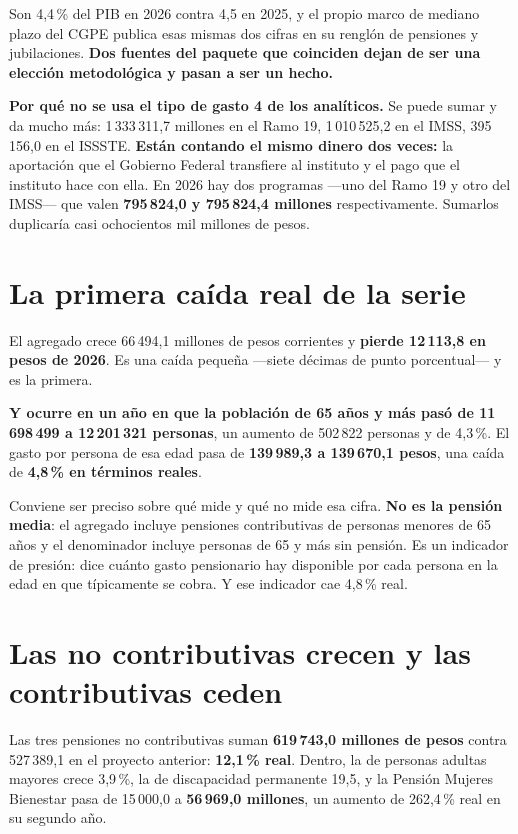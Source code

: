 Son 4,4\,\% del PIB en 2026 contra 4,5 en 2025, y el propio marco de mediano plazo del CGPE
publica esas mismas dos cifras en su renglón de pensiones y jubilaciones. \textbf{Dos fuentes
del paquete que coinciden dejan de ser una elección metodológica y pasan a ser un hecho.}

\textbf{Por qué no se usa el tipo de gasto 4 de los analíticos.} Se puede sumar y da mucho
más: 1\,333\,311,7 millones en el Ramo 19, 1\,010\,525,2 en el IMSS, 395\,156,0 en el ISSSTE.
\textbf{Están contando el mismo dinero dos veces:} la aportación que el Gobierno Federal
transfiere al instituto y el pago que el instituto hace con ella. En 2026 hay dos programas
---uno del Ramo 19 y otro del IMSS--- que valen \textbf{795\,824,0 y 795\,824,4 millones}
respectivamente. Sumarlos duplicaría casi ochocientos mil millones de pesos.

\section{La primera caída real de la serie}

El agregado crece 66\,494,1 millones de pesos corrientes y \textbf{pierde 12\,113,8 en pesos
de 2026}. Es una caída pequeña ---siete décimas de punto porcentual--- y es la primera.

\textbf{Y ocurre en un año en que la población de 65 años y más pasó de 11\,698\,499 a
12\,201\,321 personas}, un aumento de 502\,822 personas y de 4,3\,\%. El gasto por persona de
esa edad pasa de \textbf{139\,989,3 a 139\,670,1 pesos}, una caída de \textbf{4,8\,\% en
términos reales}.

Conviene ser preciso sobre qué mide y qué no mide esa cifra. \textbf{No es la pensión media}:
el agregado incluye pensiones contributivas de personas menores de 65 años y el denominador
incluye personas de 65 y más sin pensión. Es un indicador de presión: dice cuánto gasto
pensionario hay disponible por cada persona en la edad en que típicamente se cobra. Y ese
indicador cae 4,8\,\% real.

\section{Las no contributivas crecen y las contributivas ceden}



Las tres pensiones no contributivas suman \textbf{619\,743,0 millones de pesos} contra
527\,389,1 en el proyecto anterior: \textbf{12,1\,\% real}. Dentro, la de personas adultas
mayores crece 3,9\,\%, la de discapacidad permanente 19,5, y la Pensión Mujeres Bienestar pasa
de 15\,000,0 a \textbf{56\,969,0 millones}, un aumento de 262,4\,\% real en su segundo año.

